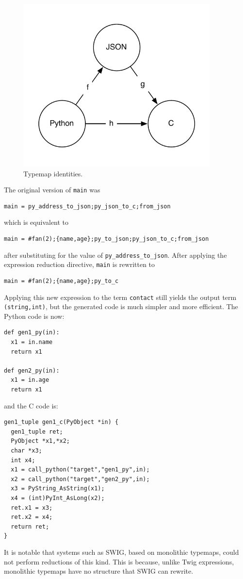 \begin{figure}[ht]
\centering
\includegraphics[width=4in]{images/python-json-c}
\caption{Typemap identities.}
\label{fig:python-json-c}
\end{figure}

The original version of \texttt{main} was

\begin{verbatim}
main = py_address_to_json;py_json_to_c;from_json
\end{verbatim}

which is equivalent to 

\begin{verbatim}
main = #fan(2);{name,age};py_to_json;py_json_to_c;from_json
\end{verbatim}

after substituting for the value of
\texttt{py\_address\_to\_json}. After applying the expression
reduction directive, \texttt{main} is rewritten to

\begin{verbatim}
main = #fan(2);{name,age};py_to_c
\end{verbatim}

Applying this new expression to the term \texttt{contact} still
yields the output term \texttt{(string,int)}, but the generated
code is much simpler and more efficient. The Python code is now:

\begin{verbatim}
def gen1_py(in):
  x1 = in.name
  return x1

def gen2_py(in):
  x1 = in.age
  return x1
\end{verbatim}

\noindent and the C code is:

\begin{verbatim}
gen1_tuple gen1_c(PyObject *in) {
  gen1_tuple ret;
  PyObject *x1,*x2;
  char *x3;
  int x4;
  x1 = call_python("target","gen1_py",in);
  x2 = call_python("target","gen2_py",in);
  x3 = PyString_AsString(x1);
  x4 = (int)PyInt_AsLong(x2);
  ret.x1 = x3;
  ret.x2 = x4;
  return ret;
}
\end{verbatim}

It is notable that systems such as SWIG, based on monolithic
typemaps, could not perform reductions of this kind. This is
because, unlike Twig expressions, monolithic typemaps have no
structure that SWIG can rewrite.
